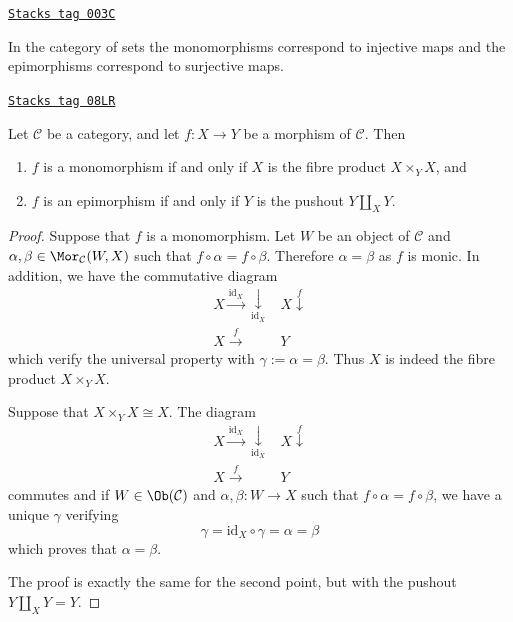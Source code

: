 \begin{example}
\label{categories-example-mono-epi-sets}
\href{https://stacks.math.columbia.edu/tag/003C}{\texttt{Stacks tag 003C}}

In the category of sets the monomorphisms correspond to injective
maps and the epimorphisms correspond to surjective maps.
\end{example}

\begin{lemma}
\label{categories-lemma-characterize-mono-epi}
\href{https://stacks.math.columbia.edu/tag/08LR}{\texttt{Stacks tag 08LR}}

Let $\mathcal{C}$ be a category, and let $f : X \to Y$ be
a morphism of $\mathcal{C}$. Then
\begin{enumerate}
\item $f$ is a monomorphism if and only if $X$ is the fibre
product $X \times_Y X$, and
\item $f$ is an epimorphism if and only if $Y$ is the pushout
$Y \amalg_X Y$.
\end{enumerate}
\end{lemma}

\begin{proof}
Suppose that $f$ is a monomorphism. Let $W$ be an object of $\mathcal C$
and $\alpha, \beta \in \Mor_\mathcal C(W,X)$ such that $f\circ \alpha = f\circ
\beta$. Therefore $\alpha = \beta$ as $f$ is monic. In addition, we have the
commutative diagram
$$
\begin{array}{cc}X \overset{\text{id}_X}{\longrightarrow}\underset{\text{id}_X}{\downarrow} & X \overset{f}{\downarrow} \\ X \overset{f}{\longrightarrow} & Y\end{array}
$$
which verify the universal property with $\gamma := \alpha = \beta$.
Thus $X$ is indeed the fibre product $X\times_Y X$.

\medskip\noindent
Suppose that $X \times_Y X \cong X $. The diagram
$$
\begin{array}{cc}X \overset{\text{id}_X}{\longrightarrow}\underset{\text{id}_X}{\downarrow} & X \overset{f}{\downarrow} \\ X \overset{f}{\longrightarrow} & Y\end{array}
$$
commutes and if $W \in \Ob(\mathcal C)$ and $\alpha, \beta : W \to X$
such that $f \circ \alpha = f \circ \beta$, we have a unique
$\gamma$ verifying
$$
\gamma = \text{id}_X\circ\gamma = \alpha = \beta
$$
which proves that $\alpha = \beta$.

\medskip\noindent
The proof is exactly the same for the second point, but with the
pushout $Y\amalg_X Y = Y$.
\end{proof}

